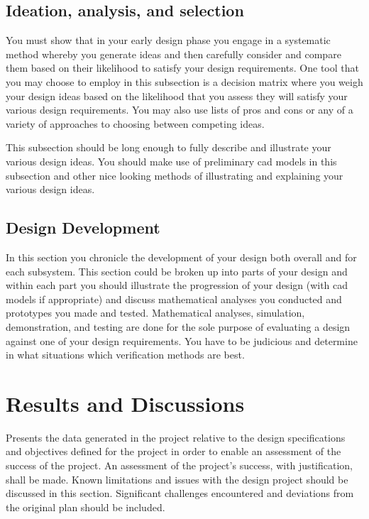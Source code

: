 \documentclass[fleqn,10pt]{project}
\begin{document}
\subsection{Ideation, analysis, and selection}

You must show that in your early design phase you engage in a systematic method whereby 
you generate ideas and then carefully consider and compare them based on their likelihood to
satisfy your design requirements. One tool that you may choose to employ in this subsection
is a decision matrix where you weigh your design ideas based on the likelihood that 
you assess they will satisfy your various design requirements.  You may also use lists
of pros and cons or any of a variety of approaches to choosing between competing ideas.

This subsection should be long enough to fully describe and illustrate
your various design ideas.  You should make use of preliminary cad models in 
this subsection and other nice looking methods of illustrating and explaining
your various design ideas.

\subsection{Design Development}
In this section you chronicle the development of your design both overall
and for each subsystem. This section 
could be broken up into parts of your design and within each
part you should illustrate the progression of your design (with cad
models if appropriate) and discuss mathematical analyses you conducted and prototypes 
you made and tested. Mathematical analyses, simulation, demonstration, and testing
are done for the sole purpose of evaluating a design against
one of your design requirements. You have
to be judicious and determine in what situations which verification methods 
are best.

\section{Results and Discussions}

Presents the data generated in the project relative to the design specifications and objectives 
defined for the project in order to enable an assessment of the success of the project. An 
assessment of the project’s success, with justification, shall be made. Known limitations and 
issues with the design project should be discussed in this section. Significant challenges 
encountered and deviations from the original plan should be included.
\end{document}
